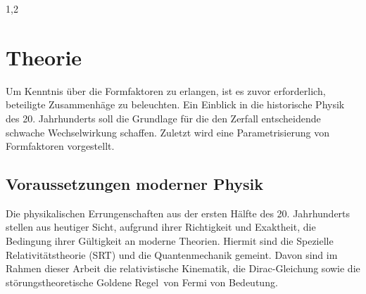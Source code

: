 \documentclass[11pt,a4paper,twoside]{report}
\begin{document}
\begin{spacing}{1,2}
\chapter{Theorie}
Um Kenntnis über die Formfaktoren zu erlangen, ist es zuvor erforderlich, beteiligte Zusammenhäge zu beleuchten. Ein Einblick in die historische Physik
des 20. Jahrhunderts soll die Grundlage für die den Zerfall entscheidende schwache Wechselwirkung schaffen. Zuletzt wird eine Parametrisierung von Formfaktoren
vorgestellt.

\section{Voraussetzungen moderner Physik}
Die physikalischen Errungenschaften aus der ersten Hälfte des 20. Jahrhunderts stellen aus heutiger Sicht, aufgrund ihrer Richtigkeit und Exaktheit, die 
Bedingung ihrer Gültigkeit an moderne Theorien.
Hiermit sind die Spezielle Relativitätstheorie (SRT) und die Quantenmechanik gemeint. Davon sind im Rahmen dieser 
Arbeit die relativistische Kinematik, die Dirac-Gleichung sowie die störungstheoretische \glqq Goldene Regel\grqq \ von Fermi
von Bedeutung.


\end{spacing}
\end{document}
